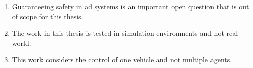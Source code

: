 \begin{enumerate}
	\item Guaranteeing safety in \gls{ad} systems is an important open question that is out of scope for this thesis. 
	\item The work in this thesis is tested in simulation environments and not real world. 
	\item This work considers the control of one vehicle and not multiple agents. 
	
	
\end{enumerate}


